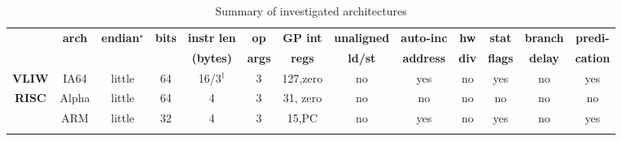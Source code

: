 \begin{sidewaystable}[tbp]
\caption{Summary of investigated architectures}
\label{table:archtable}
\begin{sf}
\begin{footnotesize}
\begin{center}
\begin{tabular}{|c|c||c|c|c|c|c|c|c|c|c|c|c|}
\hline
\T \multirow{2}{*}{\bf Type} &
\multirow{2}{*}{\bf arch} &
\multirow{2}{*}{\bf endian$^{\star}$} & 
\multirow{2}{*}{\bf bits} & 
{\bf instr len} & 
{\bf op} & 
{\bf GP int} & 
{\bf unaligned} & 
{\bf auto-inc} & 
{\bf hw}  &
{\bf stat} &
{\bf branch} & 
{\bf predi-}\\

        & %
        & %
        & %
        & %
{\bf (bytes)} & %
{\bf args}    & %
{\bf regs}    & %
{\bf ld/st}   & %
{\bf address} & %
{\bf div}     & %
{\bf flags}   & %
{\bf delay}   & %
{\bf cation}\\  %

\hline\hline


\multirow{1}{*}{\bf VLIW} &
IA64             &  %
little           &  %
64               &  %
16/3$^{\dagger}$ &  %
3                &  %
127,zero         &  %
no               &  %
yes              &  %
no               &  %
yes              &  %
no               &  %
yes                 %
\\
\hline
\hline


\multirow{8}{*}{\bf RISC} &
Alpha            & %
little           & %
64               & %
4                & %
3                & %
31, zero         & %
no               & %
no               & %
no               & %
no               & %
no               & %
no                 %
\\
\cline{2-13}

                 & %
ARM              & %
little           & %
32               & %
4                & %
3                & %
15,PC            & %
no               & %
yes              & %
no               & %
yes              & %
no               & %
yes                %
\\
\cline{2-13}


\end{tabular}
\end{center}
\end{footnotesize}
\end{sf}
\end{sidewaystable}

